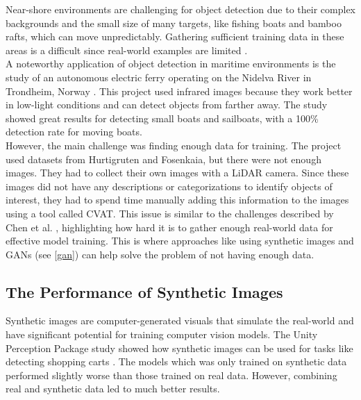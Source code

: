 \noindent Near-shore environments are challenging for object detection due to their complex backgrounds and the small size of many targets, like fishing boats and bamboo rafts, which can move unpredictably. Gathering sufficient training data in these areas is a difficult since real-world examples are limited \cite{safety}.\\

\noindent A noteworthy application of object detection in maritime environments is the study of an autonomous electric ferry operating on the Nidelva River in Trondheim, Norway \cite{NTNUFerry}. This project used infrared images because they work better in low-light conditions and can detect objects from farther away. The study showed great results for detecting small boats and sailboats, with a 100\% detection rate for moving boats. \\

\noindent However, the main challenge was finding enough data for training. The project used datasets from Hurtigruten and Fosenkaia, but there were not enough images. They had to collect their own images with a LiDAR camera. Since these images did not have any descriptions or categorizations to identify objects of interest, they had to spend time manually adding this information to the images using a tool called CVAT. This issue is similar to the challenges described by Chen et al. \cite{safety}, highlighting how hard it is to gather enough real-world data for effective model training. This is where approaches like using synthetic images and GANs (see \ref{gan}) can help solve the problem of not having enough data. \\

\subsection{The Performance of Synthetic Images}

Synthetic images are computer-generated visuals that simulate the real-world and have significant potential for training computer vision models. The Unity Perception Package study showed how synthetic images can be used for tasks like detecting shopping carts \cite{borkman2021unityperceptiongeneratesynthetic}. The models which was only trained on synthetic data performed slightly worse than those trained on real data. However, combining real and synthetic data led to much better results. \\

